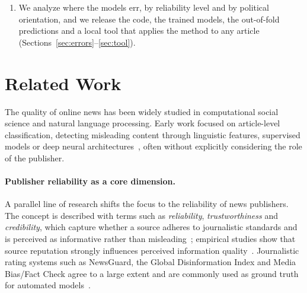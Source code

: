 \documentclass[11pt,a4paper]{article}
\begin{document}
\begin{enumerate}
        split, or outlets of the same owner with their copies in the training data, lowers the error by 6--12 points,
        while masking outlets and journalists changes it by less than half a point. As for sites with the same
        label~\cite{zhou2021hidden}, what inflates the results goes with the similarity between training and test texts,
        which a common owner only signals (Section~\ref{sec:ladder}).
  \item We analyze where the models err, by reliability level and by political orientation, and we release the code,
        the trained models, the out-of-fold predictions and a local tool that applies the method to any article
        (Sections~\ref{sec:errors}--\ref{sec:tool}).
\end{enumerate}

\section{Related Work}\label{sec:related}

The quality of online news has been widely studied in computational social science and natural language processing.
Early work focused on article-level classification, detecting misleading content through linguistic features,
supervised models or deep neural architectures~\cite{pandolfi2020automatic}, often without explicitly considering the
role of the publisher.

\paragraph{Publisher reliability as a core dimension.}
A parallel line of research shifts the focus to the reliability of news publishers. The concept is described with
terms such as \emph{reliability}, \emph{trustworthiness} and \emph{credibility}, which capture whether a source adheres
to journalistic standards and is perceived as informative rather than
misleading~\cite{digitalmedia2007,infodisorder2017,10.1145/302979.303001}; empirical studies show that source
reputation strongly influences perceived information quality~\cite{doi:10.1080/07421222.2019.1628921}. Journalistic
rating systems such as NewsGuard, the Global Disinformation Index and Media Bias/Fact Check agree to a large extent and
are commonly used as ground truth for automated models~\cite{lin2023high,DBLP:conf/icwsm/PratelliP22}.
\end{document}
